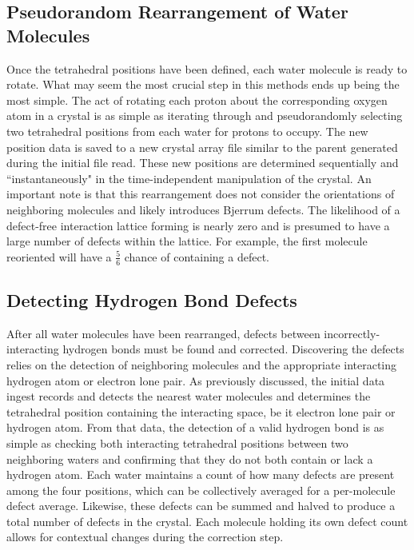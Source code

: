\subsection{Pseudorandom Rearrangement of Water Molecules}

Once the tetrahedral positions have been defined, each water molecule is ready to rotate.
What may seem the most crucial step in this methods ends up being the most simple.
The act of rotating each proton about the corresponding oxygen atom in a crystal is as simple as iterating through and pseudorandomly selecting two tetrahedral positions from each water for protons to occupy.
The new position data is saved to a new crystal array file similar to the parent generated during the initial file read.
These new positions are determined sequentially and ``instantaneously" in the time-independent manipulation of the crystal.
An important note is that this rearrangement does not consider the orientations of neighboring molecules and likely introduces Bjerrum defects.
The likelihood of a defect-free interaction lattice forming is nearly zero and is presumed to have a large number of defects within the lattice. 
For example, the first molecule reoriented will have a $\frac{5}{6}$ chance of containing a defect.


\subsection{Detecting Hydrogen Bond Defects}

After all water molecules have been rearranged, defects between incorrectly-interacting hydrogen bonds must be found and corrected.
Discovering the defects relies on the detection of neighboring molecules and the appropriate interacting hydrogen atom or electron lone pair. 
As previously discussed, the initial data ingest records and detects the nearest water molecules and determines the tetrahedral position containing the interacting space, be it electron lone pair or hydrogen atom. 
From that data, the detection of a valid hydrogen bond is as simple as checking both interacting tetrahedral positions between two neighboring waters and confirming that they do not both contain or lack a hydrogen atom.
Each water maintains a count of how many defects are present among the four positions, which can be collectively averaged for a per-molecule defect average.
Likewise, these defects can be summed and halved to produce a total number of defects in the crystal. 
Each molecule holding its own defect count allows for contextual changes during the correction step.


